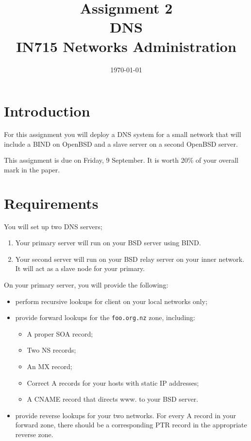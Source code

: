 \documentclass{article}
\begin{document}
\title{ Assignment 2 \\ DNS \\ IN715 Networks Administration}
\date{\today}
\maketitle

\section*{Introduction}
For this assignment you will deploy a DNS system for a small network that will include a BIND on OpenBSD and a slave server on a second OpenBSD server.

This assignment is due on Friday, 9 September.  It is worth 20\% of your overall mark in the paper.

\section{Requirements}
You will set up two DNS servers;
  \begin{enumerate}
    \item Your primary server will run on your BSD server using BIND.
    \item Your second server will run on your BSD relay server on your inner network.  It will act as a slave node for your primary.
  \end{enumerate}

On your primary server, you will provide the following:
\begin{itemize}
    \item perform recursive lookups for client on your local networks only;
    \item provide forward lookups for the \texttt{foo.org.nz} zone, 
          including:
          \begin{itemize}
            \item A proper SOA record;
            \item Two NS records;
            \item An MX record;
            \item Correct A records for your hosts with static IP addresses;
            \item A CNAME record that directs www. to your
                  BSD server.
          \end{itemize}
    \item provide reverse lookups for your two networks.  For every A record 
          in your forward zone, there should be a corresponding PTR record 
          in the appropriate reverse zone.
\end{itemize}
\end{document}
